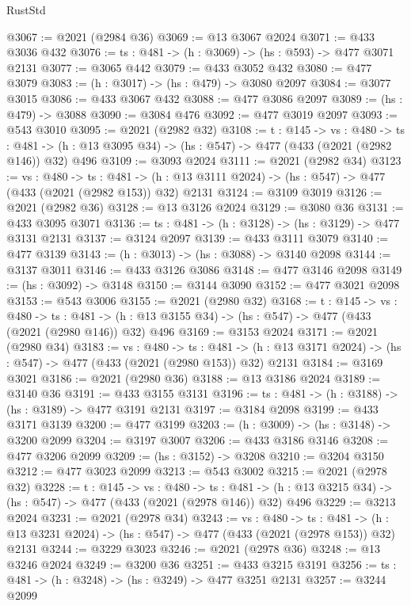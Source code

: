 \begin{lexlean}{RustStd}
\begin{coremodule}
{\begin{coremodule}
{{{{{{{{{{{{{{{{@3067 := @2021 (@2984 @36)
@3069 := @13 @3067 @2024
@3071 := @433 @3036 @432
@3076 := {ts : @481} -> (h : @3069) -> (hs : @593) -> @477 @3071 @2131
@3077 := @3065 @442
@3079 := @433 @3052 @432
@3080 := @477 @3079
@3083 := (h : @3017) -> (hs : @479) -> @3080 @2097
@3084 := @3077 @3015
@3086 := @433 @3067 @432
@3088 := @477 @3086 @2097
@3089 := (hs : @479) -> @3088
@3090 := @3084 @476
@3092 := @477 @3019 @2097
@3093 := @543 @3010
@3095 := @2021 (@2982 @32)
@3108 := {t : @145} ->
  {vs : @480} ->
  {ts : @481} -> (h : @13 @3095 @34) -> (hs : @547) -> @477 (@433 (@2021 (@2982 @146)) @32) @496
@3109 := @3093 @2024
@3111 := @2021 (@2982 @34)
@3123 := {vs : @480} ->
  {ts : @481} -> (h : @13 @3111 @2024) -> (hs : @547) -> @477 (@433 (@2021 (@2982 @153)) @32) @2131
@3124 := @3109 @3019
@3126 := @2021 (@2982 @36)
@3128 := @13 @3126 @2024
@3129 := @3080 @36
@3131 := @433 @3095 @3071
@3136 := {ts : @481} -> (h : @3128) -> (hs : @3129) -> @477 @3131 @2131
@3137 := @3124 @2097
@3139 := @433 @3111 @3079
@3140 := @477 @3139
@3143 := (h : @3013) -> (hs : @3088) -> @3140 @2098
@3144 := @3137 @3011
@3146 := @433 @3126 @3086
@3148 := @477 @3146 @2098
@3149 := (hs : @3092) -> @3148
@3150 := @3144 @3090
@3152 := @477 @3021 @2098
@3153 := @543 @3006
@3155 := @2021 (@2980 @32)
@3168 := {t : @145} ->
  {vs : @480} ->
  {ts : @481} -> (h : @13 @3155 @34) -> (hs : @547) -> @477 (@433 (@2021 (@2980 @146)) @32) @496
@3169 := @3153 @2024
@3171 := @2021 (@2980 @34)
@3183 := {vs : @480} ->
  {ts : @481} -> (h : @13 @3171 @2024) -> (hs : @547) -> @477 (@433 (@2021 (@2980 @153)) @32) @2131
@3184 := @3169 @3021
@3186 := @2021 (@2980 @36)
@3188 := @13 @3186 @2024
@3189 := @3140 @36
@3191 := @433 @3155 @3131
@3196 := {ts : @481} -> (h : @3188) -> (hs : @3189) -> @477 @3191 @2131
@3197 := @3184 @2098
@3199 := @433 @3171 @3139
@3200 := @477 @3199
@3203 := (h : @3009) -> (hs : @3148) -> @3200 @2099
@3204 := @3197 @3007
@3206 := @433 @3186 @3146
@3208 := @477 @3206 @2099
@3209 := (hs : @3152) -> @3208
@3210 := @3204 @3150
@3212 := @477 @3023 @2099
@3213 := @543 @3002
@3215 := @2021 (@2978 @32)
@3228 := {t : @145} ->
  {vs : @480} ->
  {ts : @481} -> (h : @13 @3215 @34) -> (hs : @547) -> @477 (@433 (@2021 (@2978 @146)) @32) @496
@3229 := @3213 @2024
@3231 := @2021 (@2978 @34)
@3243 := {vs : @480} ->
  {ts : @481} -> (h : @13 @3231 @2024) -> (hs : @547) -> @477 (@433 (@2021 (@2978 @153)) @32) @2131
@3244 := @3229 @3023
@3246 := @2021 (@2978 @36)
@3248 := @13 @3246 @2024
@3249 := @3200 @36
@3251 := @433 @3215 @3191
@3256 := {ts : @481} -> (h : @3248) -> (hs : @3249) -> @477 @3251 @2131
@3257 := @3244 @2099
}}}}}}}}}}}}}}}}
\end{coremodule}}
\end{coremodule}
\end{lexlean}
